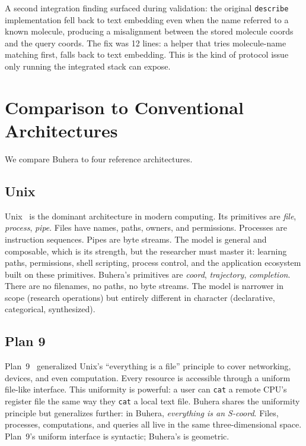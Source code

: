 \documentclass[11pt,twocolumn,a4paper]{article}
\begin{document}
A second integration finding surfaced during validation: the original \texttt{describe} implementation fell back to text embedding even when the name referred to a known molecule, producing a misalignment between the stored molecule coords and the query coords. The fix was 12 lines: a helper that tries molecule-name matching first, falls back to text embedding. This is the kind of protocol issue only running the integrated stack can expose.


\section{Comparison to Conventional Architectures}
\label{sec:comparison}

We compare Buhera to four reference architectures.

\subsection{Unix}
Unix~\cite{ritchie1974unix,tanenbaum2015modern} is the dominant architecture in modern computing. Its primitives are \emph{file}, \emph{process}, \emph{pipe}. Files have names, paths, owners, and permissions. Processes are instruction sequences. Pipes are byte streams. The model is general and composable, which is its strength, but the researcher must master it: learning paths, permissions, shell scripting, process control, and the application ecosystem built on these primitives. Buhera's primitives are \emph{coord}, \emph{trajectory}, \emph{completion}. There are no filenames, no paths, no byte streams. The model is narrower in scope (research operations) but entirely different in character (declarative, categorical, synthesized).

\subsection{Plan 9}
Plan~9~\cite{pike1995plan9} generalized Unix's ``everything is a file'' principle to cover networking, devices, and even computation. Every resource is accessible through a uniform file-like interface. This uniformity is powerful: a user can \texttt{cat} a remote CPU's register file the same way they \texttt{cat} a local text file. Buhera shares the uniformity principle but generalizes further: in Buhera, \emph{everything is an S-coord}. Files, processes, computations, and queries all live in the same three-dimensional space. Plan~9's uniform interface is syntactic; Buhera's is geometric.
\end{document}

